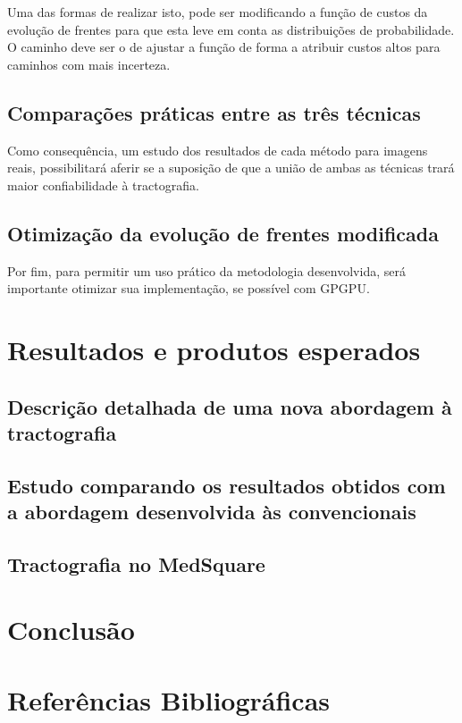 \documentclass[a4paper,11pt]{report}
\begin{document}
  Uma das formas de realizar isto, pode ser modificando a função de custos da evolução de frentes para que esta leve em conta as distribuições de probabilidade. O caminho deve ser o de ajustar a função de forma a atribuir custos altos para caminhos com mais incerteza.

  \section{Comparações práticas entre as três técnicas}
  Como consequência, um estudo dos resultados de cada método para imagens reais, possibilitará aferir se a suposição de que a união de ambas as técnicas trará maior confiabilidade à tractografia.
  
  \section{Otimização da evolução de frentes modificada}
  Por fim, para permitir um uso prático da metodologia desenvolvida, será importante otimizar sua implementação, se possível com GPGPU.

\chapter{Resultados e produtos esperados}
  \section{Descrição detalhada de uma nova abordagem à tractografia}
  
  \section{Estudo comparando os resultados obtidos com a abordagem desenvolvida às convencionais}
  
  \section{Tractografia no MedSquare}

\chapter{Conclusão}

\chapter{Referências Bibliográficas}
\end{document}
